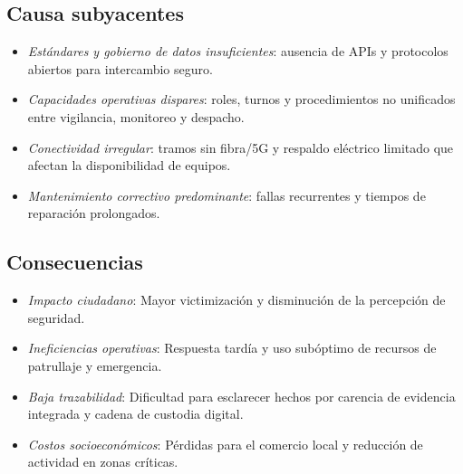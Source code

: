 \documentclass[12pt,a4paper]{article}
\begin{document}
\subsection*{Causa subyacentes}
\begin{itemize}
    \item \textit{Estándares y gobierno de datos insuficientes}: ausencia de APIs y protocolos abiertos para intercambio seguro.
    \item \textit{Capacidades operativas dispares}: roles, turnos y procedimientos no unificados entre vigilancia, monitoreo y despacho.
    \item \textit{Conectividad irregular}: tramos sin fibra/5G y respaldo eléctrico limitado que afectan la disponibilidad de equipos.
    \item \textit{Mantenimiento correctivo predominante}: fallas recurrentes y tiempos de reparación prolongados.
\end{itemize}

\subsection*{Consecuencias}
\begin{itemize}
    \item \textit{Impacto ciudadano}: Mayor victimización y disminución de la percepción de seguridad.
    \item \textit{Ineficiencias operativas}: Respuesta tardía y uso subóptimo de recursos de patrullaje y emergencia.
    \item \textit{Baja trazabilidad}: Dificultad para esclarecer hechos por carencia de evidencia integrada y cadena de custodia digital.
    \item \textit{Costos socioeconómicos}: Pérdidas para el comercio local y reducción de actividad en zonas críticas.
\end{itemize}
\end{document}
